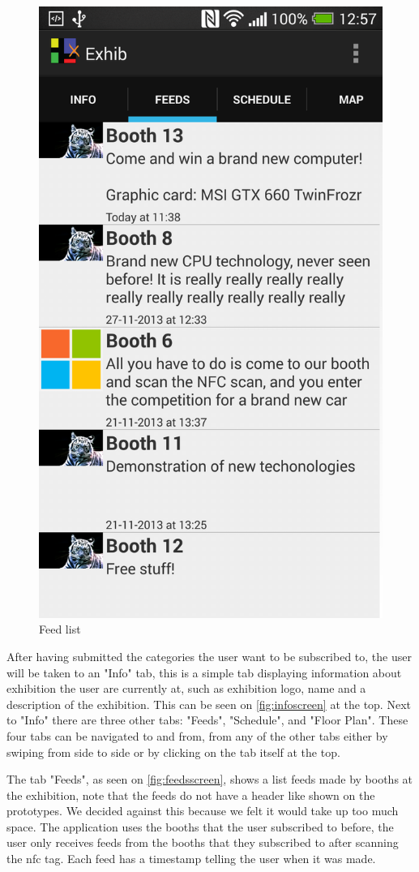 \begin{figure}[H]
\begin{minipage}[b]{0.5\columnwidth}
\includegraphics[width=0.7\columnwidth]{img/finaldesign/feedsscreen.png}
\caption{Feed list} 
\label{fig:feedsscreen}
\end{minipage}
\end{figure}

After having submitted the categories the user want to be subscribed to, the user will be taken to an "Info" tab, this is a simple tab displaying information about exhibition the user are currently at, such as exhibition logo, name and a description of the exhibition. This can be seen on \autoref{fig:infoscreen}  at the top. Next to "Info" there are three other tabs: "Feeds", "Schedule", and "Floor Plan". These four tabs can be navigated to and from, from any of the other tabs either by swiping from side to side or by clicking on the tab itself at the top.

The tab "Feeds", as seen on \autoref{fig:feedsscreen}, shows a list feeds made by booths at the exhibition, note that the feeds do not have a header like shown on the prototypes. We decided against this because we felt it would take up too much space. The application uses the booths that the user subscribed to before, the user only receives feeds from the booths that they subscribed to after scanning the \ac{nfc} tag. Each feed has a timestamp telling the user when it was made.


